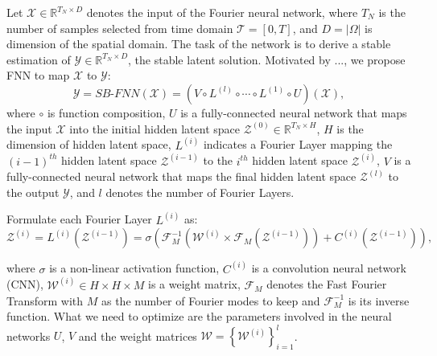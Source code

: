 Let $\mathcal{X}\in \mathbb{R}^{T_{N}\times D}$ denotes the input of the Fourier neural network, where $T_{N}$ is the number of samples selected from time domain $\mathcal{T}=\left[0,T\right]$, and $D=\left|\Omega\right|$ is dimension of the spatial domain. The task of the network is to derive a stable estimation of $\mathcal{Y}\in \mathbb{R}^{T_{N}\times D}$, the stable latent solution. Motivated by ..., we propose FNN to map $\mathcal{X}$ to $\mathcal{Y}$:
\begin{equation}
\mathcal{Y}=SB\text{-}FNN\left(\mathcal{X}\right)=\left( V \circ L^{\left(l\right)} \circ \cdots \circ L^{\left(1\right)}\circ U \right)\left(\mathcal{X}\right),
\end{equation}
where $\circ$ is function composition, $ U$ is a fully-connected neural network that maps the input $\mathcal{X}$ into the initial hidden latent space $\mathcal{Z}^{\left(0\right)}\in \mathbb{R}^{T_{N}\times H}$, $H$ is the dimension of hidden latent space, $L^{\left(i\right)}$ indicates a Fourier Layer mapping the $\left(i-1\right)^{th}$ hidden latent space $\mathcal{Z}^{\left(i-1\right)}$ to the $i^{th}$ hidden latent space $\mathcal{Z}^{\left(i\right)}$, $ V$ is a fully-connected neural network that maps the final hidden latent space $\mathcal{Z}^{\left(l\right)}$ to the output $\mathcal{Y}$, and $l$ denotes the number of Fourier Layers.

Formulate each Fourier Layer $L^{\left(i\right)}$ as:
\begin{equation}
\mathcal{Z}^{\left(i\right)}=L^{\left(i\right)}\left(\mathcal{Z}^{\left(i-1\right)}\right)=\sigma\left( \mathcal{F}^{-1}_{M}\left(\mathcal{W}^{\left(i\right)}\times \mathcal{F}_{M}\left(\mathcal{Z}^{\left(i-1\right)}\right)\right) + C^{\left(i\right)}\left(\mathcal{Z}^{\left(i-1\right)}\right)\right),
\end{equation}

where $\sigma$ is a non-linear activation function, $C^{\left(i\right)}$ is a convolution neural network (CNN), $\mathcal{W}^{\left(i\right)}\in H\times H\times M$ is a weight matrix, $\mathcal{F}_{M}$ denotes the Fast Fourier Transform with $M$ as the number of Fourier modes to keep and $\mathcal{F}^{-1}_{M}$ is its inverse function. What we need to optimize are the parameters involved in the neural networks $U$, $V$ and the weight matrices $\mathcal{W}=\left\{\mathcal{W}^{\left(i\right)}\right\}^{l}_{i=1}$.


